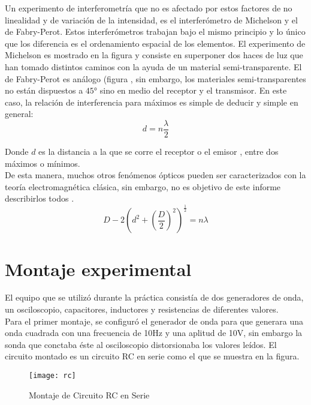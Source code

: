\documentclass[%
 reprint,
 amsmath,amssymb,
 aps,
]{revtex4-1}
\begin{document}
Un experimento de interferometría que no es afectado por estos factores de no linealidad y de variación de la intensidad, es el interferómetro de Michelson y el de Fabry-Perot. Estos interferómetros trabajan bajo el mismo principio y lo único que los diferencia es el ordenamiento espacial de los elementos. El experimento de Michelson es mostrado en la figura \cite{fig:Michelson} y consiste en superponer dos haces de luz que han tomado distintos caminos con la ayuda de un material semi-transparente. El de Fabry-Perot es análogo (figura \cite{fig:fabry}, sin embargo, los materiales semi-transparentes no están dispuestos a $45°$ sino en medio del receptor y el transmisor.  En este caso, la relación de interferencia para máximos es simple de deducir y simple en general:\\

\begin{equation}
d = n\frac{\lambda}{2}
\label{Michelson}
\end{equation}

Donde $d$ es la distancia a la que se corre el receptor o el emisor , entre dos máximos o mínimos. \\

De esta manera, muchos otros fenómenos ópticos pueden ser caracterizados con la teoría electromagnética clásica, sin embargo, no es objetivo de este informe describirlos todos .\\ 
\begin{equation}
D-2{\left(d^2 + {\left(\frac{D}{2}\right)}^2\right)}^\frac{1}{2} = n\lambda
\label{Lloyd}
\end{equation}
\section{\label{sec:level1}Montaje experimental}
El equipo que se utiliz\'o durante la práctica consist\'ia de dos generadores de onda, un osciloscopio, capacitores, inductores y resistencias de diferentes valores.\\

Para el primer montaje, se configur\'o el generador de onda para que generara una onda cuadrada con una frecuencia de 10Hz y una aplitud de 10V, sin embargo la sonda que conctaba \'este al osciloscopio distorsionaba los valores le\'idos. El circuito montado es un circuito RC en serie como el que se muestra en la figura.\\

\begin{figure}[h!]
\caption{Montaje de Circuito RC en Serie}
\centering
\texttt{[image: rc]}
\end{figure}
\end{document}
